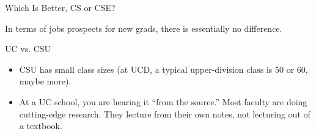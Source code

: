 \documentclass[%
pdf,
colorBG,
slideColor,
azure
]{prosper}
\begin{document}
\begin{slide}{Which Is Better, CS or CSE?}

In terms of jobs prospects for new grads, there is essentially no
difference.

\end{slide}



\begin{slide}{UC vs. CSU}

\begin{itemize}

\item CSU has small class sizes (at UCD, a typical upper-division class
is 50 or 60, maybe more).

\item At a UC school, you are hearing it ``from the source.''  Most
faculty are doing cutting-edge research.  They lecture from their own
notes, not lecturing out of a textbook.

\end{itemize}

\end{slide}
\end{document}
